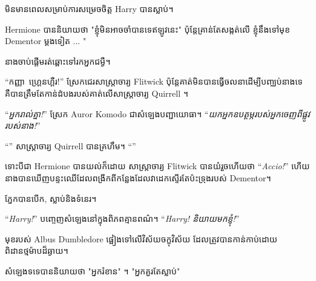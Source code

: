 មិនមានពេលសម្រាប់ការសម្រេចចិត្ត Harry បានស្លាប់។

Hermione បាននិយាយថា "ខ្ញុំមិនអាចចាំបានទេឥឡូវនេះ" ប៉ុន្តែគ្រាន់តែសង្កត់លើ ខ្ញុំនឹងទៅមុខ Dementor ម្តងទៀត ... "

នាងចាប់ផ្តើមរត់ឆ្ពោះទៅរកអ្នកជម្ងឺ។

“កញ្ញា~ហ្គ្រេនហ្គឺរ!” ស្រែក​ជេរ​សាស្ត្រាចារ្យ Flitwick ប៉ុន្តែ​គាត់​មិន​បាន​ធ្វើ​ចលនា​ដើម្បី​បញ្ឈប់​នាង​ទេ គឺ​បាន​ត្រឹមតែ​កាន់​ដំបង​របស់គាត់​លើ​សាស្ត្រាចារ្យ Quirrell ។

“\emph{អ្នករាល់គ្នា!}” ស្រែក Auror Komodo ជាសំឡេងបញ្ជាយោធា។ “\emph{យកអ្នកឧបត្ថម្ភរបស់អ្នកចេញពីផ្លូវរបស់នាង!}”

“” សាស្ត្រាចារ្យ Quirrell បានគ្រហឹម។ “”

ទោះបីជា Hermione បានយល់ក៏ដោយ សាស្ត្រាចារ្យ Flitwick បានយំរួចហើយថា “\emph{Accio!}” ហើយនាងបានឃើញបន្ទះឈើដែលពង្រីកពីកន្លែងដែលវាដេកស្ទើរតែប៉ះទ្រុងរបស់ Dementor។

\later

ភ្នែកបានបើក, ស្លាប់និងទំនេរ។

“\emph{Harry!}” បញ្ចេញសំឡេងនៅក្នុងពិភពគ្មានពណ៌។ “\emph{Harry! និយាយមកខ្ញុំ!}”

មុខរបស់ Albus Dumbledore ផ្អៀងទៅលើវិស័យចក្ខុវិស័យ ដែលត្រូវបានកាន់កាប់ដោយពិដានថ្មម៉ាបដ៏ឆ្ងាយ។

សំឡេងទទេបាននិយាយថា "អ្នករំខាន" ។ "អ្នកគួរតែស្លាប់"

